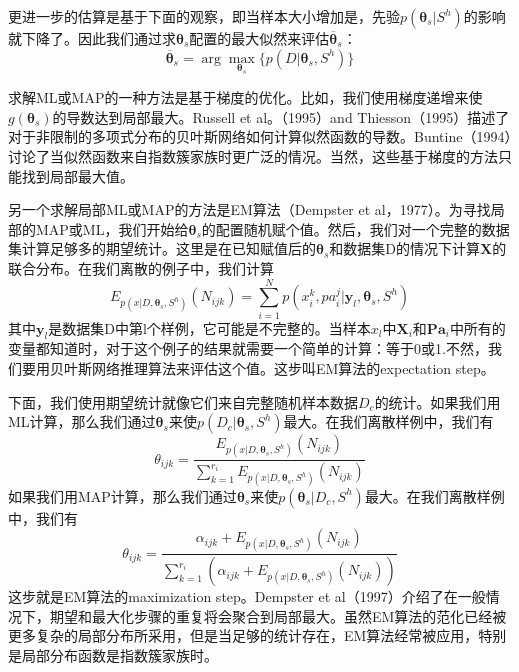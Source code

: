 \documentclass[10pt,a4paper]{article}
\begin{document}
\begin{CJK*}{UTF8}{gkai}
更进一步的估算是基于下面的观察，即当样本大小增加是，先验$p(\boldsymbol{\theta}_s|S^h)$的影响就下降了。因此我们通过求$\boldsymbol{\theta}_s$配置的最大似然来评估$\overline{\boldsymbol{\theta}}_s$：
\begin{equation}
\overline{\boldsymbol{\theta}}_s=\arg \max_{\boldsymbol{\theta}_s} \{p(D|\boldsymbol{\theta}_s,S^h)\} \nonumber
\end{equation}


求解ML或MAP的一种方法是基于梯度的优化。比如，我们使用梯度递增来使$g(\boldsymbol{\theta}_s)$的导数达到局部最大。Russell et al。（1995）and Thiesson（1995）描述了对于非限制的多项式分布的贝叶斯网络如何计算似然函数的导数。Buntine（1994）讨论了当似然函数来自指数簇家族时更广泛的情况。当然，这些基于梯度的方法只能找到局部最大值。


另一个求解局部ML或MAP的方法是EM算法（Dempster et al，1977）。为寻找局部的MAP或ML，我们开始给$\boldsymbol{\theta}_s$的配置随机赋个值。然后，我们对一个完整的数据集计算足够多的期望统计。这里是在已知赋值后的$\boldsymbol{\theta}_s$和数据集D的情况下计算$\boldsymbol{X}$的联合分布。在我们离散的例子中，我们计算
\begin{equation}
E_{p(x|D,\boldsymbol{\theta}_s,S^h)}(N_{ijk})=\sum_{i=1}^N 
p(x_i^k,pa_i^j|\boldsymbol{y}_l,\boldsymbol{\theta}_s,S^h)
\end{equation}
其中$\boldsymbol{y}_l$是数据集D中第l个样例，它可能是不完整的。当样本$x_l$中$\boldsymbol{X}_i$和$\boldsymbol{Pa}_i$中所有的变量都知道时，对于这个例子的结果就需要一个简单的计算：等于0或1.不然，我们要用贝叶斯网络推理算法来评估这个值。这步叫EM算法的expectation step。


下面，我们使用期望统计就像它们来自完整随机样本数据$D_c$的统计。如果我们用ML计算，那么我们通过$\boldsymbol{\theta}_s$来使$p(D_c|\boldsymbol{\theta}_s,S^h)$最大。在我们离散样例中，我们有
\begin{equation}
\theta_{ijk}=
\frac{E_{p(x|D,\boldsymbol{\theta}_s,S^h)}(N_{ijk})}
{\sum_{k=1}^{r_i}E_{p(x|D,\boldsymbol{\theta}_s,S^h)}(N_{ijk})} \nonumber
\end{equation}
如果我们用MAP计算，那么我们通过$\boldsymbol{\theta}_s$来使$p(\boldsymbol{\theta}_s|D_c,S^h)$最大。在我们离散样例中，我们有
\begin{equation}
\theta_{ijk}=
\frac{\alpha_{ijk}+E_{p(x|D,\boldsymbol{\theta}_s,S^h)}(N_{ijk})}
{\sum_{k=1}^{r_i}(\alpha_{ijk}+E_{p(x|D,\boldsymbol{\theta}_s,S^h)}(N_{ijk}))}  \nonumber
\end{equation}
这步就是EM算法的maximization step。Dempster et al（1997）介绍了在一般情况下，期望和最大化步骤的重复将会聚合到局部最大。虽然EM算法的范化已经被更多复杂的局部分布所采用，但是当足够的统计存在，EM算法经常被应用，特别是局部分布函数是指数簇家族时。




\end{CJK*}
\end{document}
